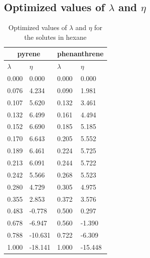 \documentclass[
	12pt,				%
	openany,			%
	oneside,			%
	a4paper,			%
	english,			%
	brazil				%
	]{abntex2}
\begin{document}
\begin{apendicesenv}


\chapter{Optimized values of $\lambda$ and $\eta$}
\begin{table}[h]
	\centering
	\caption{Optimized values of $\lambda$ and $\eta$ for the solutes in hexane}
	\begin{tabular}{llll}
		\hline
        \multicolumn{2}{c}{pyrene}& \multicolumn{2}{c}{phenanthrene}\\
		\hline
		$\lambda$ & $\eta$  & $\lambda$ & $\eta$   \\ 
		\hline
   0.000	&	0.000	&	0.000	&	0.000	\\
   0.076	&	4.234	&	0.090	&	1.981	\\
   0.107	&	5.620	&	0.132	&	3.461	\\
   0.132	&	6.499	&	0.161	&	4.494	\\
   0.152	&	6.690	&	0.185	&	5.185	\\
   0.170	&	6.643	&	0.205	&	5.552	\\
   0.189	&	6.461	&	0.224	&	5.725	\\
   0.213	&	6.091	&	0.244	&	5.722	\\
   0.242	&	5.566	&	0.268	&	5.523	\\
   0.280	&	4.729	&	0.305	&	4.975	\\
   0.355	&	2.853	&	0.372	&	3.576	\\
   	0.483	&	-0.778	&	0.500	&	0.297	\\
   	0.678	&	-6.947	&	0.560	&	-1.390	\\
   	0.788	&	-10.631	&	0.722	&	-6.309	\\
   	1.000	&	-18.141	&	1.000	&	-15.448	\\
   	\hline
   \end{tabular}
\end{table}


\end{apendicesenv}
\end{document}
